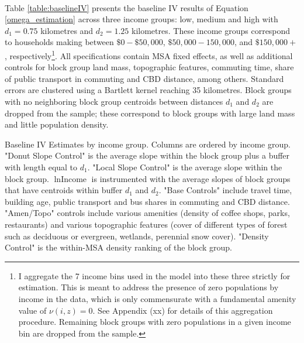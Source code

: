 \documentclass[11pt]{article}
\begin{document}
\paragraph*{}
Table \ref{table:baselineIV} presents the baseline IV results of Equation \eqref{omega_estimation} across three income groups: low, medium and high with $d_{1} = 0.75$ kilometres and $d_{2} = 1.25$ kilometres. These income groups correspond to households making between $\$0 - \$50,000$, $\$50,000 - 150,000$, and $\$150,000+$, respectively\footnote{ I aggregate the 7 income bins used in the model into these three strictly for estimation. This is meant to address the presence of zero populations by income in the data, which is only commensurate with a fundamental amenity value of $\nu(i, z) = 0$. See Appendix (xx) for details of this aggregation procedure. Remaining block groups with zero populations in a given income bin are dropped from the sample.}. All specifications contain MSA fixed effects, as well as additional controls for block group land mass, topographic features, commuting time, share of public transport in commuting and CBD distance, among others. Standard errors are clustered using a Bartlett kernel reaching 35 kilometres. Block groups with no neighboring block group centroids between distances $d_{1}$ and $d_{2}$ are dropped from the sample; these correspond to block groups with large land mass and little population density.

\begin{table}[htbp]
	
	\caption{Baseline IV Estimates by income group. Columns are ordered by income group. "Donut Slope Control" is the average slope within the block group plus a buffer with length equal to $d_{1}$. "Local Slope Control" is the average slope within the block group. $\ln \text{Income}$ is instrumented with the average slopes of block groups that have centroids within buffer $d_{1}$ and $d_{2}$. "Base Controls" include travel time, building age, public transport and bus shares in commuting and CBD distance. "Amen/Topo" controls include various amenities (density of coffee shops, parks, restaurants) and various topographic features (cover of different types of forest such as deciduous or evergreen, wetlands, perennial snow cover). "Density Control" is the within-MSA density ranking of the block group.}\label{table:baselineIV}
\end{table}
\end{document}
